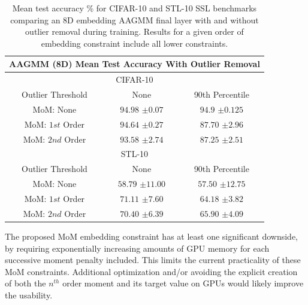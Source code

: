 \documentclass[10pt,twocolumn,letterpaper]{article}
\begin{document}
\begin{table}[ht!]
	\begin{tabular}{c|c|c}
		
		\multicolumn{3}{c}{AAGMM (8D) Mean Test Accuracy With Outlier Removal} \\ \hline\hline
		\multicolumn{3}{c}{CIFAR-10}            \\ 
		\hline
		Outlier Threshold & None & 90th Percentile \\
		\hline
		MoM: None & $94.98$ \scriptsize{$\pm 0.07$} & $94.9$ \scriptsize{$\pm 0.125$} \\
		MoM: $1st$ Order & $94.64$ \scriptsize{$\pm 0.27$} & $87.70$ \scriptsize{$\pm 2.96$}\\
		MoM: $2nd$ Order & $93.58$ \scriptsize{$\pm 2.74$} & $87.25$ \scriptsize{$\pm 2.51$} \\
		
		\hline
		\hline
		\multicolumn{3}{c}{STL-10}            \\ 
		\hline
		Outlier Threshold & None & 90th Percentile \\
		\hline
		MoM: None & $58.79$ \scriptsize{$\pm 11.00$} & $57.50$ \scriptsize{$\pm 12.75$} \\
		MoM: $1st$ Order & $71.11$ \scriptsize{$\pm 7.60$} & $64.18$ \scriptsize{$\pm 3.82$}\\
		MoM: $2nd$ Order & $70.40$ \scriptsize{$\pm 6.39$} & $65.90$ \scriptsize{$\pm 4.09$} \\
	\end{tabular}
	\caption{Mean test accuracy \% for CIFAR-10 and STL-10 SSL benchmarks comparing an 8D embedding AAGMM final layer with and without outlier removal during training. Results for a given order of embedding constraint include all lower constraints.}
	\label{outlierRemoval}
\end{table}

The proposed MoM embedding constraint has at least one significant downside, by requiring exponentially increasing amounts of GPU memory for each successive moment penalty included.
This limits the current practicality of these MoM constraints. 
Additional optimization and/or avoiding the explicit creation of both the $n^{th}$ order moment and its target value on GPUs would likely improve the usability.
\end{document}

